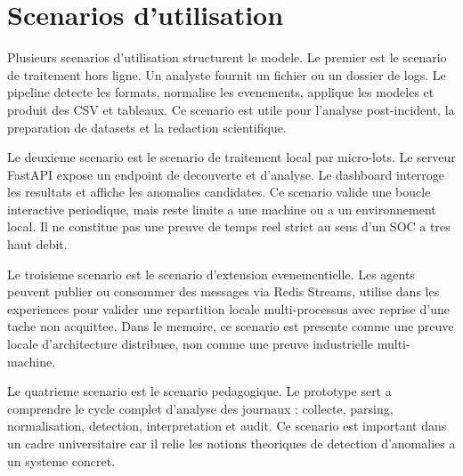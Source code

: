 \section{Scenarios d'utilisation}
Plusieurs scenarios d'utilisation structurent le modele. Le premier est le scenario de traitement hors ligne. Un analyste fournit un fichier ou un dossier de logs. Le pipeline detecte les formats, normalise les evenements, applique les modeles et produit des CSV et tableaux. Ce scenario est utile pour l'analyse post-incident, la preparation de datasets et la redaction scientifique.

Le deuxieme scenario est le scenario de traitement local par micro-lots. Le serveur FastAPI expose un endpoint de decouverte et d'analyse. Le dashboard interroge les resultats et affiche les anomalies candidates. Ce scenario valide une boucle interactive periodique, mais reste limite a une machine ou a un environnement local. Il ne constitue pas une preuve de temps reel strict au sens d'un SOC a tres haut debit.

Le troisieme scenario est le scenario d'extension evenementielle. Les agents peuvent publier ou consommer des messages via Redis Streams, utilise dans les experiences pour valider une repartition locale multi-processus avec reprise d'une tache non acquittee. Dans le memoire, ce scenario est presente comme une preuve locale d'architecture distribuee, non comme une preuve industrielle multi-machine.

Le quatrieme scenario est le scenario pedagogique. Le prototype sert a comprendre le cycle complet d'analyse des journaux : collecte, parsing, normalisation, detection, interpretation et audit. Ce scenario est important dans un cadre universitaire car il relie les notions theoriques de detection d'anomalies a un systeme concret.
